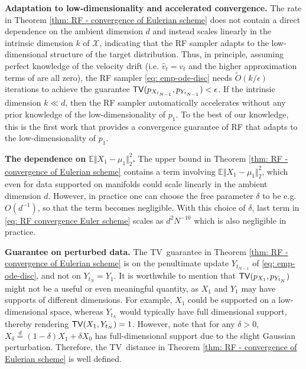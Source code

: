 \documentclass{article}
\theoremstyle{plain}
\theoremstyle{definition}
\theoremstyle{remark}
\def\bbE{\mathbb{E}}
\def\cX{\mathcal{X}}
\def\Norm#1{\Vert#1\Vert}
\def\TV{{\sf TV}}
\newcommand{\Law}{\text{Law}}
\begin{document}




\textbf{Adaptation to low-dimensionality and accelerated convergence.}  The rate in Theorem \ref{thm: RF - convergence of Eulerian scheme} does not contain a direct dependence on the ambient dimension $d$ and instead scales linearly in the intrinsic dimension $k$ of $\cX$, indicating that the RF sampler adapts to the low-dimensional structure of the target distribution. Thus, in principle, assuming perfect knowledge of the velocity drift (i.e. $\widehat v_t = v_t$ and the higher approximation terms of  are all zero), the RF sampler \eqref{eq: emp-ode-disc} needs $\tilde O(k/\epsilon)$ iterations to achieve the guarantee $\TV(p_{X_{t_{N-1}}}, p_{Y_{t_{N-1}}}) < \epsilon$. If the intrinsic dimension $k \ll d$, then the RF sampler automatically accelerates without any prior knowledge of the low-dimensionality of $p_1$. To the best of our knowledge, this is the first work that provides a convergence guarantee of RF that adapts to the low-dimensionality of $p_1$. 

\textbf{The dependence on $\bbE \Norm{X_1 - \mu_1}_2^2$.} %
The upper bound in Theorem \ref{thm: RF - convergence of Eulerian scheme} contains a term involving $\bbE\Norm{X_1 - \mu_1}_2^2$, which even for data supported on manifolds could scale linearly in the ambient dimension $d$. However, in practice one can choose the free parameter $\delta$ to be e.g. $O(d^{-1})$, so that the term becomes negligible. With this choice of $\delta$, last term in \eqref{eq: RF convergence Euler scheme} scales as $d^2 N^{-10}$ which is also negligible in practice. 

\textbf{Guarantee on perturbed data.} The \TV~guarantee in Theorem \ref{thm: RF - convergence of Eulerian scheme} is on the penultimate update $Y_{t_{N-1}}$ of \eqref{eq: emp-ode-disc}, and not on $Y_{t_N} = Y_1$. It is worthwhile to mention that $\TV(p_{X_1}, p_{Y_{t_N}})$ might not be a useful or even meaningful quantity, as $X_1$ and $Y_1$  may have  supports of different dimensions. For example, $X_1$ could be supported on a low-dimensional space, whereas $Y_{t_N}$ would typically have full dimensional support, thereby rendering $\TV (X_1, Y_{t_N}) =1 $. However, note that for any $\delta > 0$, $X_{\delta} \overset{d}{=} (1 - \delta) X_1 + \delta X_0$ has full-dimensional  support due to the slight Gaussian perturbation. Therefore, the \TV~distance in Theorem \ref{thm: RF - convergence of Eulerian scheme} is well defined.
\end{document}
